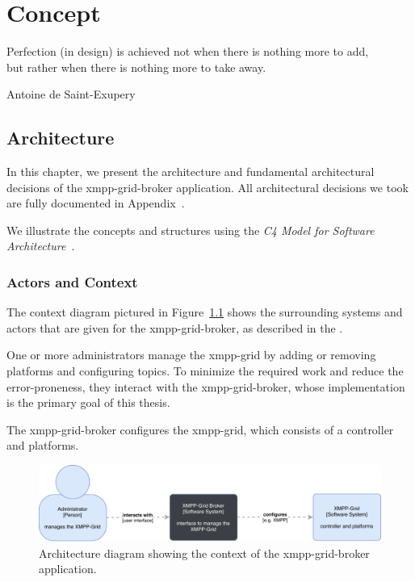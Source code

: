 \chapter{Concept} %
\epigraph{Perfection (in design) is achieved not when there is nothing more to add,\\but rather when there is nothing more to take away.}{Antoine de Saint-Exupery}


\section{Architecture}\label{sec:architecture}

In this chapter, we present the architecture and fundamental architectural decisions of the \gls{xmpp-grid-broker} application.
All architectural decisions we took are fully documented in Appendix~.

We illustrate the concepts and structures using the \emph{C4 Model for Software Architecture}~\cite{c4-model}.

\subsection{Actors and Context}

The context diagram pictured in Figure~\ref{fig:architecturecontext} shows the surrounding systems and actors that are given for the \gls{xmpp-grid-broker}, as described in the .

One or more administrators manage the \gls{xmpp-grid} by adding or removing \glspl{platform} and configuring \glspl{topic}.
To minimize the required work and reduce the error-proneness, they interact with the \gls{xmpp-grid-broker}, whose implementation is the primary goal of this thesis.

The \gls{xmpp-grid-broker} configures the \gls{xmpp-grid}, which consists of a \gls{controller} and \glspl{platform}.

\begin{figure}[h]
\centering
\includegraphics[width=\linewidth]{resources/architecture_context}
\caption[Architecture context diagram]{Architecture diagram showing the context of the \gls{xmpp-grid-broker} application.}
\label{fig:architecturecontext}
\end{figure}


